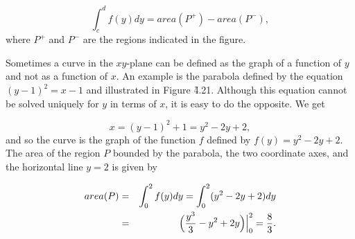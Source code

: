 $$
\int_{c}^{d} f(y) dy = area(P^{+}) - area(P^{-}),
$$
\noindent where $P^{+}$ and $P^{-}$ are the regions indicated in the figure.

Sometimes a curve in the $xy$-plane can be defined as the graph of a function of $y$ and not as a function of $x$. An example is the parabola defined by the equation $(y -1)^2 = x - 1$ and illustrated in Figure \f{4.21}. Although this equation cannot be solved uniquely for $y$ in terms of $x$, it is easy to do the opposite. We get

$$
x = (y -1)^2 + 1 = y^2 - 2y + 2,
$$
\noindent and so the curve is the graph of the function $f$ defined by $f(y) = y^2 - 2y + 2$. The area of the region $P$ bounded by the parabola, the two coordinate axes, and the horizontal line $y = 2$ is given by

\begin{eqnarray*}
area(P) &=& \int_{0}^{2} f(y)dy = \int_{0}^{2} (y^2 - 2y + 2) dy \\
        &=& \Bigl( \frac{y^3}{3} - y^2 + 2y \Bigr) \Big|_{0}^{2} = \frac{8}{3}.
\end{eqnarray*}



